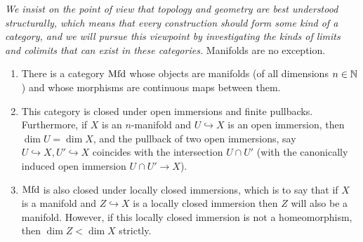         \textit{We insist on the point of view that topology and geometry are best understood structurally, which means that every construction should form some kind of a category, and we will pursue this viewpoint by investigating the kinds of limits and colimits that can exist in these categories.} Manifolds are no exception. 
        \begin{proposition}
            \begin{enumerate}
                \item There is a category $\mathrm{Mfd}$ whose objects are manifolds (of all dimensions $n \in \mathbb{N}$) and whose morphisms are continuous maps between them.
                \item This category is closed under open immersions and finite pullbacks. Furthermore, if $X$ is an $n$-manifold and $U \hookrightarrow  X$ is an open immersion, then $\dim U = \dim X$, and the pullback of two open immersions, say $U \hookrightarrow  X, U' \hookrightarrow  X$ coincides with the intersection $U \cap U'$ (with the canonically induced open immersion $U \cap U' \to X$). 
                \item $\mathrm{Mfd}$ is also closed under locally closed immersions, which is to say that if $X$ is a manifold and $Z \hookrightarrow X$ is a locally closed immersion then $Z$ will also be a manifold. However, if this locally closed immersion is not a homeomorphism, then $\dim Z < \dim X$ strictly.
            \end{enumerate}
        \end{proposition}
